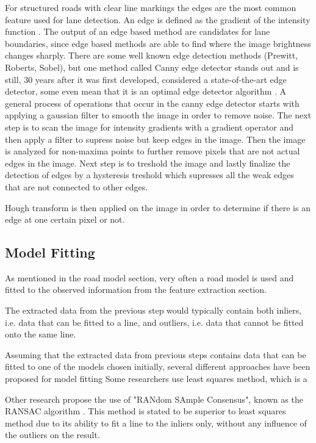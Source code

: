 For structured roads with clear line markings the edges are the most common feature used for lane detection. An edge is defined as the gradient of the intensity function \cite{Yenikaya:2013:KVR:2522968.2522970}. The output of an edge based method are candidates for lane boundaries, since edge based methods are able to find where the image brightness changes sharply. There are some well known edge detection methods (Prewitt, Roberts, Sobel), but one method called Canny edge detector stands out and is still, 30 years after it was first developed, considered a state-of-the-art edge detector, some even mean that it is an optimal edge detector algorithm \cite{bhadauria2013comparison}. A general process of operations that occur in the canny edge detector starts with applying a gaussian filter to smooth the image in order to remove noise. The next step is to scan the image for intensity gradients with a gradient operator and then apply a filter to supress noise but keep edges in the image. Then the image is analyzed for non-maxima points to further remove pixels that are not actual edges in the image. Next step is to treshold the image and lastly finalize the detection of edges by a hysteresis treshold which supresses all the weak edges that are not connected to other edges. 

Hough transform is then applied on the image in order to determine if there is an edge at one certain pixel or not. 


\subsection{Model Fitting}
As mentioned in the road model section, very often a road model is used and fitted to the observed information from the feature extraction section. 

The extracted data from the previous step would typically contain both inliers, i.e. data that can be fitted to a line, and outliers, i.e. data that cannot be fitted onto the same line. \cite{raguram2008comparative}

Assuming that the extracted data from previous steps contains data that can be fitted to one of the models chosen initially, several different approaches have been proposed for model fitting \cite{BarHillel2014} 
Some researchers use least squares method, which is a 

Other research propose the use of "RANdom SAmple Consensus", known as the RANSAC algorithm \cite{huang2009finding}\cite{aly2008real} \cite{li2013lane}. This method is stated to be superior to least squares method due to its ability to fit a line to the inliers only, without any influence of the outliers on the result.  


